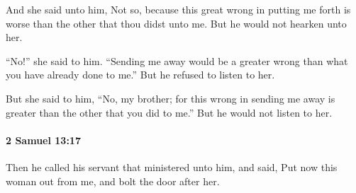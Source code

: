			\begin{versebox}
					\item[BHS] 
					\item[ASV] And she said unto him, Not so, because this great wrong in putting me forth is worse than the other that thou didst unto me. But he would not hearken unto her.
					\item[NIV] “No!” she said to him. “Sending me away would be a greater wrong than what you have already done to me.” But he refused to listen to her.
					\item[NRSV] But she said to him, “No, my brother; for this wrong in sending me away is greater than the other that you did to me.” But he would not listen to her.
			\end{versebox}

		\paragraph{2 Samuel 13:17} %
			\label{2SAMUEL-13-17}

			Then he called his servant that ministered unto him, and said, Put now this woman out from me, and bolt the door after her.

